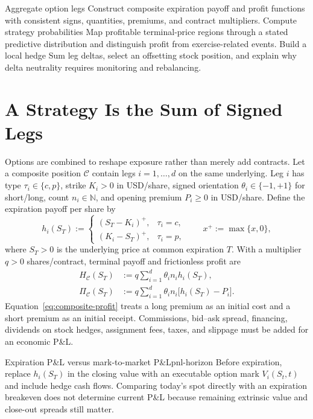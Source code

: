 \documentclass[11pt]{article}
\begin{document}

\learningobjectives
  {Aggregate option legs}
  {Construct composite expiration payoff and profit functions with consistent signs, quantities, premiums, and contract multipliers.}
  {Compute strategy probabilities}
  {Map profitable terminal-price regions through a stated predictive distribution and distinguish profit from exercise-related events.}
  {Build a local hedge}
  {Sum leg deltas, select an offsetting stock position, and explain why delta neutrality requires monitoring and rebalancing.}

\section{A Strategy Is the Sum of Signed Legs}

Options are combined to reshape exposure rather than merely add contracts. Let a composite position $\mathcal C$ contain legs $i=1,\ldots,d$ on the same underlying. Leg $i$ has type $\tau_i\in\{c,p\}$, strike $K_i>0$ in USD/share, signed orientation $\theta_i\in\{-1,+1\}$ for short/long, count $n_i\in\mathbb N$, and opening premium $P_i\geq 0$ in USD/share. Define the expiration payoff per share by
\begin{equation}
  \label{eq:leg-payoff}
  h_i(S_T):=
  \begin{cases}
    (S_T-K_i)^+, & \tau_i=c,\\
    (K_i-S_T)^+, & \tau_i=p,
  \end{cases}
  \qquad x^+:=\max\{x,0\},
\end{equation}
where $S_T>0$ is the underlying price at common expiration $T$. With a multiplier $q>0$ shares/contract, terminal payoff and frictionless profit are
\begin{align}
  \label{eq:composite-payoff}
  H_{\mathcal C}(S_T)
  &:=q\sum_{i=1}^{d}\theta_i n_i h_i(S_T),\\
  \label{eq:composite-profit}
  \Pi_{\mathcal C}(S_T)
  &:=q\sum_{i=1}^{d}\theta_i n_i\bigl[h_i(S_T)-P_i\bigr].
\end{align}
Equation~\eqref{eq:composite-profit} treats a long premium as an initial cost and a short premium as an initial receipt. Commissions, bid--ask spread, financing, dividends on stock hedges, assignment fees, taxes, and slippage must be added for an economic P\&L.

\begin{remark}{Expiration P\&L versus mark-to-market P\&L}{pnl-horizon}
Before expiration, replace $h_i(S_T)$ in the closing value with an executable option mark $V_i(S_t,t)$ and include hedge cash flows. Comparing today's spot directly with an expiration breakeven does not determine current P\&L because remaining extrinsic value and close-out spreads still matter.
\end{remark}
\end{document}
